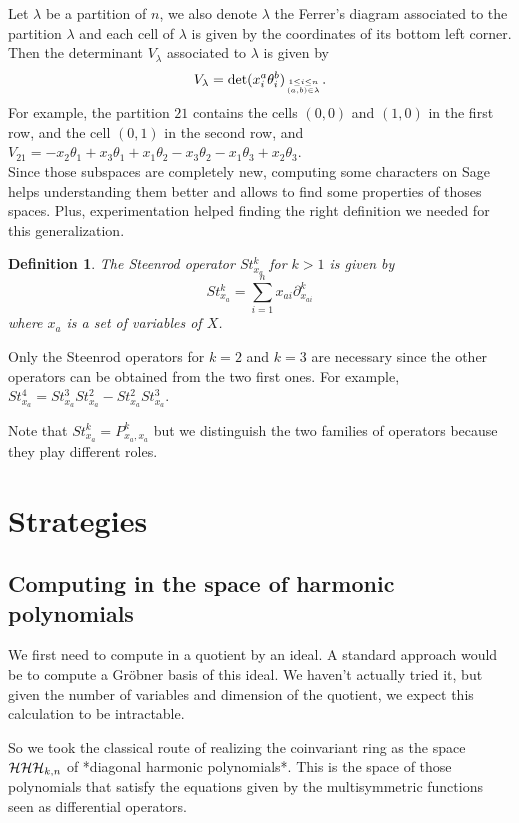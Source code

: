 \documentclass[letter,12pt]{article}
\newcommand{\pauline}[1]{\todo[linecolor=blue,backgroundcolor=blue!25,bordercolor=blue]{#1}}
\DeclareMathOperator{\harmonics}{\mathcal{H}}
\newtheorem{definition}{Definition}
\begin{document}
	Let $\lambda$ be a partition of $n$, we also denote $\lambda$ the Ferrer's diagram associated to the partition $\lambda$ and each cell of $\lambda$ is given by the coordinates of its bottom left corner. Then the determinant $V_{\lambda}$ associated to $\lambda$ is given by $$V_{\lambda} = \det (x_i^a \theta_i^b)_{1 \leq i \leq n \atop (a,b) \in \lambda} .$$
	For example, the partition $21$ contains the cells $(0,0)$ and $(1,0)$ in the first row, and the cell $(0,1)$ in the second row, and $V_{21} = -x_2\theta_1 + x_3\theta_1 + x_1\theta_2 - x_3\theta_2 - x_1\theta_3 + x_2\theta_3$. \\
	
	Since those subspaces are completely new, computing some characters on Sage helps understanding them better and allows to find some properties of thoses spaces. 
	Plus, experimentation helped finding the right definition we needed for this generalization.
	
	\begin{definition} \pauline{find the right place}
		The \emph{Steenrod operator} $St_{x_a}^k$ for $k>1$ is given by
		$$St_{x_a}^k = \sum_{i=1}^{n} x_{ai} \partial_{x_{ai}}^k$$
		where $x_a$ is a set of variables of $X$. 
	\end{definition}


	Only the Steenrod operators for $k=2$ and $k=3$ are necessary since the other operators can be obtained from the two first ones. For example, $St_{x_a}^4 = St_{x_a}^3St_{x_a}^2 - St_{x_a}^2St_{x_a}^3$. 

	Note that $St_{x_a}^k = P_{x_a,x_a}^k$ but we distinguish the two families of operators because they play different roles. 
	
	\section{Strategies}
	
	\subsection{Computing in the space of harmonic polynomials}
	
	We first need to compute in a quotient by an ideal.
	A standard approach would be to compute a Gröbner basis of this ideal.
	We haven't actually tried it, but given the number of variables and dimension of the quotient, we expect this calculation to be intractable.
	
	So we took the classical route of realizing the coinvariant ring as the space $\def\harmonics{\mathcal{H}}\harmonics_{k,n}$ of *diagonal harmonic polynomials*.
	This is the space of those polynomials that satisfy the equations given by the multisymmetric functions seen as differential operators.
	
\end{document}
